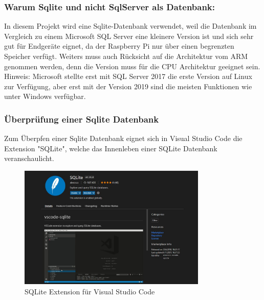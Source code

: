\subsubsection*{Warum Sqlite und nicht SqlServer als Datenbank:}

In diesem Projekt wird eine Sqlite-Datenbank verwendet, weil die Datenbank im Vergleich zu einem Microsoft SQL Server eine kleinere
Version ist und sich sehr gut für Endgeräte eignet, da der Raspberry Pi nur über einen begrenzten Speicher verfügt.
Weiters muss auch Rücksicht auf die Architektur vom ARM genommen werden, denn die Version muss für die CPU Architektur geeignet sein.
Hinweis: Microsoft stellte erst mit SQL Server 2017 die erste Version auf Linux zur Verfügung, aber erst mit der Version 2019 sind die meisten
Funktionen wie unter Windows verfügbar.

\subsubsection*{Überprüfung einer Sqlite Datenbank}
Zum Überpfen einer Sqlite Datenbank eignet sich in Visual Studio Code die Extension "SQLite", 
welche das Innenleben einer SQLite Datenbank veranschaulicht.

\begin{figure}[H]
    \centering
    \includegraphics[width=0.8\textwidth]{./pics/SQLiteVSCodeExtension.JPG}
    \caption{SQLite Extension für Visual Studio Code}
\end{figure}

